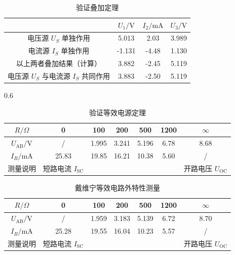 \documentclass[10.5pt]{config}
\begin{document}
\begin{table}[H]
    \centering
    \small
    \begin{tabular}{|c|c|c|c|}
        \hline
         & $U_1/\mathrm{V}$ & $I_2/\mathrm{mA}$ & $U_3/\mathrm{V}$ \\
        \hline
        电压源 $U_S$ 单独作用 &5.013 & 2.03&3.989 \\
        \hline
        电流源 $I_S$ 单独作用 & -1.131& -4.48& 1.130\\
        \hline
        以上两者叠加结果（计算）  & 3.882& -2.45& 5.119\\
        \hline
        电压源 $U_S$ 与电流源 $I_S$ 共同作用 & 3.883& -2.50&5.119 \\
        \hline
    \end{tabular}
    \caption{验证叠加定理}
    \label{tab:superposition}
\end{table}

0.6
\begin{table}[H]
    \centering
    \small
    \begin{tabular}{|c|c|c|c|c|c|c|}
        \hline
        $R/\Omega$ & 0 & 100 & 200 & 500 & 1200 & $\infty$ \\
        \hline
        $U_{\mathrm{AB}}/\mathrm{V}$ & /& 1.995& 3.241& 5.196&6.78 & 8.68\\
        \hline
        $I_R/\mathrm{mA}$ &25.83 &19.85 &16.21 &10.38 &5.60 &/ \\
        \hline
        测量说明 & 短路电流 $I_{\mathrm{SC}}$ & & & & & 开路电压 $U_{\mathrm{OC}}$ \\
        \hline
    \end{tabular}
    \caption{验证等效电源定理}
    \label{tab:thevenin}
\end{table}

\begin{table}[H]
    \centering
    \small
    \begin{tabular}{|c|c|c|c|c|c|c|}
        \hline
        $R/\Omega$ & 0 & 100 & 200 & 500 & 1200 & $\infty$ \\
        \hline
        $U_{\mathrm{AB}}/\mathrm{V}$ & /&1.959 &3.183 &5.139& 6.72&8.70 \\
        \hline
        $I_R/\mathrm{mA}$ &25.28 &19.55 &16.04&10.23 &5.57 &/ \\
        \hline
        测量说明 & 短路电流 $I_{\mathrm{SC}}$ & & &  & &  开路电压 $U_{\mathrm{OC}}$ \\
        \hline
    \end{tabular}
    \caption{戴维宁等效电路外特性测量}
    \label{tab:thevenin_equiv}
\end{table}
\end{document}
